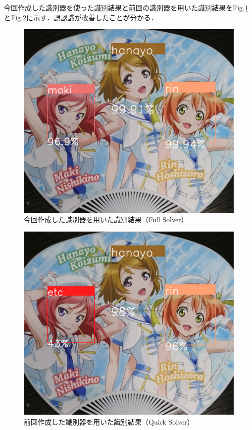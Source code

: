 \documentclass[a4paper,10pt]{jsarticle}
\begin{document}
今回作成した識別器を使った識別結果と前回の識別器を用いた識別結果をFig.\ref{182834_26Jul15}とFig.\ref{182844_26Jul15}に示す．誤認識が改善したことが分かる．

\begin{figure}[tb]
 \begin{center}
  \includegraphics[clip,width=12cm, bb = 0 0 996 870]{./fig/jpg/lovelive-full-result.jpg}
 \end{center}
 \caption{今回作成した識別器を用いた識別結果（Full Solver）}
 \label{182834_26Jul15}
\end{figure}
\begin{figure}[tb]
 \begin{center}
  \includegraphics[clip,width=12cm, bb = 0 0 996 870]{./fig/jpg/lovelive-quick-result.jpg}
 \end{center}
 \caption{前回作成した識別器を用いた識別結果（Quick Solver）}
 \label{182844_26Jul15}
\end{figure}
\end{document}
